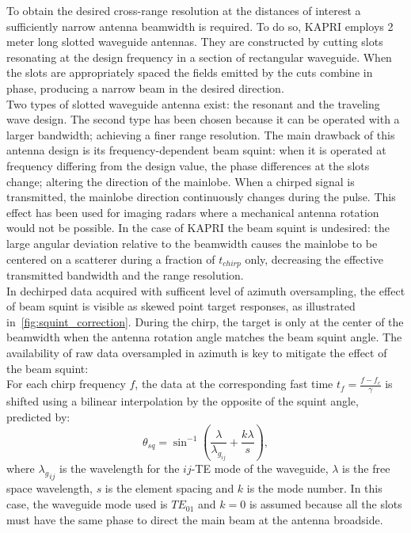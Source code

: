 To obtain the desired cross-range resolution at the distances of interest a sufficiently narrow antenna beamwidth is required. To do so, KAPRI employs 2 meter long slotted waveguide antennas\cite{Hines1953a,Granet2007}. They are constructed by cutting slots resonating at the design frequency in a section of rectangular waveguide. When the slots are appropriately spaced the fields emitted by the cuts combine in phase, producing a narrow beam in the desired direction.\\ Two types of slotted waveguide antenna exist\cite{Enjiu2013}: the resonant and the traveling wave design. The second type has been chosen because it can be operated with a larger bandwidth; achieving a finer range resolution. The main drawback of this antenna design is its frequency-dependent beam squint: when it is operated at frequency differing from the design value, the phase differences at the slots change; altering the direction of the mainlobe. When a chirped signal is transmitted, the mainlobe direction continuously changes during the pulse. This effect has been used for imaging radars where a mechanical antenna rotation would not be possible\cite{Yang2014,Yang2012,Mayer2003,Alvarez2013}. In the case of KAPRI the beam squint is undesired: the large angular deviation relative to the beamwidth causes the mainlobe to be centered on a scatterer during a fraction of $t_{chirp}$ only, decreasing the effective transmitted bandwidth and the range resolution.\\ 
In dechirped data acquired with sufficent level of azimuth oversampling, the effect of beam squint is visible as skewed point target responses, as illustrated in~\autoref{fig:squint_correction}. During the chirp, the target is only at the center of the beamwidth when the antenna rotation angle matches the beam squint angle. 
The availability of raw data oversampled in azimuth is key to mitigate the effect of the beam squint:\\ For each chirp frequency $f$, the data at the corresponding fast time $t_{f} = \frac{f - f_c}{\gamma}$  is shifted using a bilinear interpolation by the opposite of the squint angle, predicted by:
\begin{equation}\label{eq:squint_exact}
	\theta_{sq} = \sin^{-1}\left(\frac{\lambda}{\lambda_{g_{ij}}} + \frac{k \lambda}{s}\right),
\end{equation}
where ${\lambda_g}_{ij}$ is the wavelength for the $ij$-TE mode of the waveguide, $\lambda$ is the free space wavelength, $s$ is the element spacing and $k$ is the mode number. In this case, the waveguide mode used is $TE_{01}$ and $k=0$ is assumed because all the slots must have the same phase\cite{kraus88} to direct the main beam at the antenna broadside.\\
